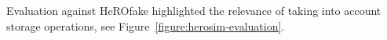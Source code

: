 


Evaluation against HeROfake highlighted the relevance of taking into account storage operations, see Figure~\ref{figure:herosim-evaluation}.






